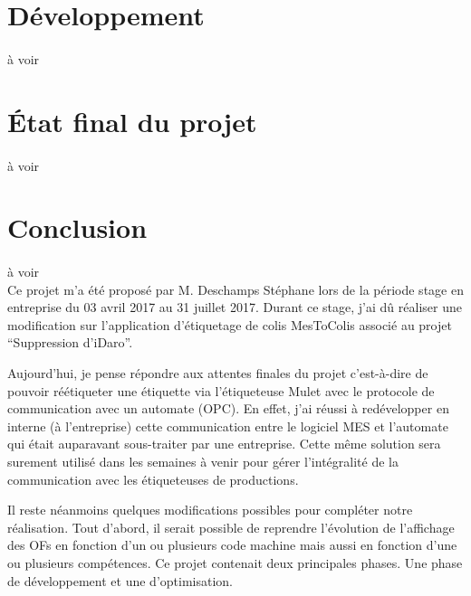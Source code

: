 \documentclass[a4paper,12pt]{extarticle}
\begin{document}
	\section{Développement}
		\paragraph{}
			à voir\\
	\clearpage
	
	\section{État final du projet}
		\paragraph{}
			à voir\\
	\clearpage
	
	\section{Conclusion}
		\paragraph{}
			à voir\\
			
			
Ce projet m’a été proposé par M. Deschamps Stéphane lors de la période stage en entreprise du 03 avril 2017 au 31 juillet 2017. Durant ce stage, j’ai dû réaliser une modification sur l’application d’étiquetage de colis MesToColis associé au projet “Suppression d’iDaro”.

Aujourd’hui, je pense répondre aux attentes finales du projet c’est-à-dire de pouvoir réétiqueter une étiquette via l’étiqueteuse Mulet avec le protocole de communication avec un automate (OPC). En effet, j’ai réussi à redévelopper en interne (à l’entreprise) cette communication entre le logiciel MES et l’automate qui était auparavant sous-traiter par une entreprise. Cette même solution sera surement utilisé dans les semaines à venir pour gérer l’intégralité de la communication avec les étiqueteuses de productions.

Il reste néanmoins quelques modifications possibles pour compléter notre réalisation. Tout d’abord, il serait possible de reprendre l’évolution de l’affichage des OFs en fonction d’un ou plusieurs code machine mais aussi en fonction d’une ou plusieurs compétences.
Ce projet contenait deux principales phases. Une phase de développement et une d’optimisation.
\end{document}
